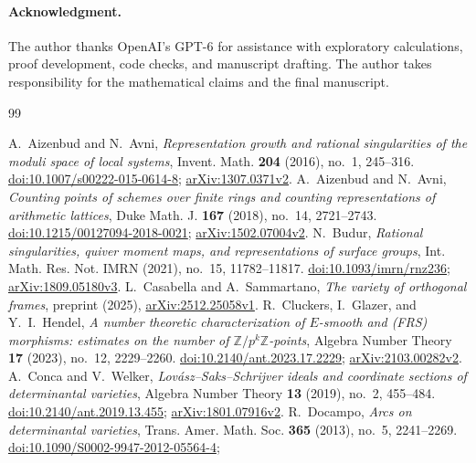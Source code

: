 \documentclass[11pt]{article}
\numberwithin{equation}{section}
\theoremstyle{remark}
\newcommand{\Z}{\mathbb Z}
\begin{document}
\paragraph{Acknowledgment.}
The author thanks OpenAI's GPT-6 for assistance with exploratory
calculations, proof development, code checks, and manuscript drafting.
The author takes responsibility for the mathematical claims and the final
manuscript.

\begin{thebibliography}{99}
\small\raggedright
\setlength{\itemsep}{2pt}
\setlength{\parsep}{0pt}
A.~Aizenbud and N.~Avni,
\emph{Representation growth and rational singularities of the moduli
space of local systems}, Invent. Math. \textbf{204} (2016), no.~1, 245--316.
\href{https://doi.org/10.1007/s00222-015-0614-8}{doi:10.1007/s00222-015-0614-8};
\href{https://arxiv.org/abs/1307.0371v2}{arXiv:1307.0371v2}.
A.~Aizenbud and N.~Avni,
\emph{Counting points of schemes over finite rings and counting
representations of arithmetic lattices},
Duke Math. J. \textbf{167} (2018), no.~14, 2721--2743.
\href{https://doi.org/10.1215/00127094-2018-0021}{doi:10.1215/00127094-2018-0021};
\href{https://arxiv.org/abs/1502.07004v2}{arXiv:1502.07004v2}.
N.~Budur, \emph{Rational singularities, quiver moment maps, and
representations of surface groups},
Int. Math. Res. Not. IMRN (2021), no.~15, 11782--11817.
\href{https://doi.org/10.1093/imrn/rnz236}{doi:10.1093/imrn/rnz236};
\href{https://arxiv.org/abs/1809.05180v3}{arXiv:1809.05180v3}.
L.~Casabella and A.~Sammartano,
\emph{The variety of orthogonal frames}, preprint (2025),
\href{https://arxiv.org/abs/2512.25058v1}{arXiv:2512.25058v1}.
R.~Cluckers, I.~Glazer, and Y.~I.~Hendel,
\emph{A number theoretic characterization of $E$-smooth and (FRS)
morphisms: estimates on the number of $\Z/p^k\Z$-points},
Algebra Number Theory \textbf{17} (2023), no.~12, 2229--2260.
\href{https://doi.org/10.2140/ant.2023.17.2229}{doi:10.2140/ant.2023.17.2229};
\href{https://arxiv.org/abs/2103.00282v2}{arXiv:2103.00282v2}.
A.~Conca and V.~Welker,
\emph{Lov\'asz--Saks--Schrijver ideals and coordinate sections of
determinantal varieties}, Algebra Number Theory \textbf{13} (2019),
no.~2, 455--484.
\href{https://doi.org/10.2140/ant.2019.13.455}{doi:10.2140/ant.2019.13.455};
\href{https://arxiv.org/abs/1801.07916v2}{arXiv:1801.07916v2}.
R.~Docampo, \emph{Arcs on determinantal varieties},
Trans. Amer. Math. Soc. \textbf{365} (2013), no.~5, 2241--2269.
\href{https://doi.org/10.1090/S0002-9947-2012-05564-4}{doi:10.1090/S0002-9947-2012-05564-4};

\end{thebibliography}
\end{document}
